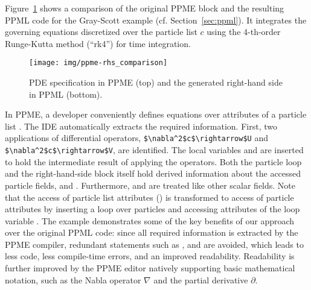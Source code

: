 Figure~\ref{fig:ode-comparison} shows a comparison of the original PPME block and the
resulting PPML code for the Gray-Scott example (cf. Section~\ref{sec:ppml}). 
It integrates the governing equations discretized over the particle list $c$ using the 
4-th-order Runge-Kutta method (``rk4'') for time integration. 
%
\begin{figure}[t]
\centering
\texttt{[image: img/ppme-rhs\_comparison]}
\caption{PDE specification in PPME (top) and the generated right-hand side in PPML (bottom).}
\label{fig:ode-comparison}
\end{figure}
%
In PPME, a developer conveniently defines equations over attributes of a particle
list . The IDE automatically extracts the required information. First, two
applications of differential operators,
\lstinline[mathescape]{$\nabla^2$c$\rightarrow$U} and
\lstinline[mathescape]{$\nabla^2$c$\rightarrow$V}, are identified. The local
variables  and  are inserted to hold the intermediate result of
applying the operators. Both the particle loop and the right-hand-side block itself
hold derived information about the accessed particle fields,  and
. Furthermore,  and  are treated like other scalar
fields. Note that the access of particle list attributes ()
is transformed to access of particle attributes by inserting a loop over particles and accessing attributes of the
loop variable .
%
The example demonstrates some of the key benefits of our approach over the
original PPML code: since all required information is extracted by the PPME
compiler, redundant statements such as ,  and
 are avoided, which leads to less code, less compile-time errors, 
and an improved readability. Readability is further improved by the PPME editor natively 
supporting basic mathematical notation, such as the Nabla operator $\nabla$ and the partial 
derivative $\partial$.




